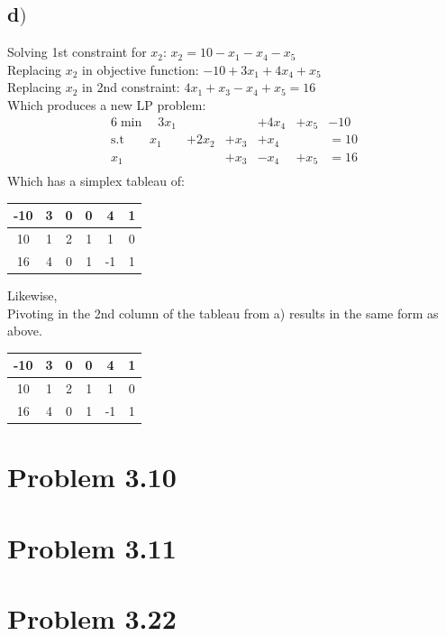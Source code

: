 \documentclass[a4paper,12pt]{article}
\begin{document}
  \subsection*{d\()\)}
    Solving 1st constraint for \(x_2\): \(x_2 = 10 - x_1 - x_4 - x_5\) \\
    Replacing \(x_2\) in objective function: \(-10 + 3x_1 + 4x_4 + x_5\) \\
    Replacing \(x_2\) in 2nd constraint: \(4x_1 + x_3 - x_4 + x_5 = 16\) \\
    Which produces a new LP problem:
    \begin{alignat*}{6}
      \min \quad 3x_1& {}& {}& + 4x_4& + x_5& - 10 \\
      \text{s.t} \quad \quad x_1& + 2x_2& + x_3& + x_4& {}& = 10\\
      x_1& {}& + x_3& - x_4& + x_5& = 16 \\
    \end{alignat*}
    Which has a simplex tableau of:
    \begin{center}
      \begin{tabular}{| c | c c c c c |}
	\hline
	-10 & 3 & 0 & 0 & 4 & 1 \\
	\hline
	10 & 1 & 2 & 1 & 1 & 0 \\
	16 & 4 & 0 & 1 & -1 & 1 \\
	\hline
      \end{tabular}
    \end{center}
    Likewise, \\
    Pivoting in the 2nd column of the tableau from a) results in the same form as above. \\
    \begin{center}
      \begin{tabular}{| c | c c c c c |}
	\hline
	-10 & 3 & 0 & 0 & 4 & 1 \\
	\hline
	10 & 1 & 2 & 1 & 1 & 0 \\
	16 & 4 & 0 & 1 & -1 & 1 \\
	\hline
      \end{tabular}
    \end{center}

\section*{Problem 3.10}
\section*{Problem 3.11}
\section*{Problem 3.22}
\end{document}
